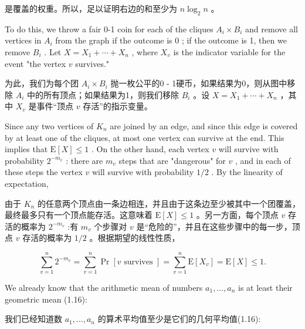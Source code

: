 \documentclass[10pt]{article}
\begin{document}
\begin{tcolorbox}\relax
是覆盖的权重。所以，足以证明右边的和至少为 \(n{\log }_{2}n\) 。
\end{tcolorbox}

To do this, we throw a fair 0-1 coin for each of the cliques \({A}_{i} \times  {B}_{i}\) and remove all vertices in \({A}_{i}\) from the graph if the outcome is 0 ; if the outcome is 1, then we remove \({B}_{i}\) . Let \(X = {X}_{1} + \cdots  + {X}_{n}\) , where \({X}_{v}\) is the indicator variable for the event "the vertex \(v\) survives."

\begin{tcolorbox}\relax
为此，我们为每个团 \({A}_{i} \times  {B}_{i}\) 抛一枚公平的0 - 1硬币，如果结果为0，则从图中移除 \({A}_{i}\) 中的所有顶点；如果结果为1，则我们移除 \({B}_{i}\) 。设 \(X = {X}_{1} + \cdots  + {X}_{n}\) ，其中 \({X}_{v}\) 是事件“顶点 \(v\) 存活”的指示变量。
\end{tcolorbox}

Since any two vertices of \({K}_{n}\) are joined by an edge, and since this edge is covered by at least one of the cliques, at most one vertex can survive at the end. This implies that \(\mathrm{E}\left\lbrack  X\right\rbrack   \leq  1\) . On the other hand, each vertex \(v\) will survive with probability \({2}^{-{m}_{v}}\) : there are \({m}_{v}\) steps that are "dangerous" for \(v\) , and in each of these steps the vertex \(v\) will survive with probability \(1/2\) . By the linearity of expectation,

\begin{tcolorbox}\relax
由于 \({K}_{n}\) 的任意两个顶点由一条边相连，并且由于这条边至少被其中一个团覆盖，最终最多只有一个顶点能存活。这意味着 \(\mathrm{E}\left\lbrack  X\right\rbrack   \leq  1\) 。另一方面，每个顶点 \(v\) 存活的概率为 \({2}^{-{m}_{v}}\) :有 \({m}_{v}\) 个步骤对 \(v\) 是“危险的”，并且在这些步骤中的每一步，顶点 \(v\) 存活的概率为 \(1/2\) 。根据期望的线性性质，
\end{tcolorbox}

\[
\mathop{\sum }\limits_{{v = 1}}^{n}{2}^{-{m}_{v}} = \mathop{\sum }\limits_{{v = 1}}^{n}\Pr \left\lbrack  {v\text{ survives }}\right\rbrack   = \mathop{\sum }\limits_{{v = 1}}^{n}\mathrm{E}\left\lbrack  {X}_{v}\right\rbrack   = \mathrm{E}\left\lbrack  X\right\rbrack   \leq  1.
\]

We already know that the arithmetic mean of numbers \({a}_{1},\ldots ,{a}_{n}\) is at least their geometric mean (1.16):

\begin{tcolorbox}\relax
我们已经知道数 \({a}_{1},\ldots ,{a}_{n}\) 的算术平均值至少是它们的几何平均值(1.16):
\end{tcolorbox}
\end{document}
